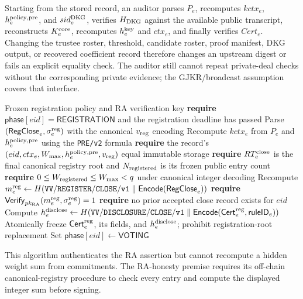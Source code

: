 \documentclass[pdflatex,sn-mathphys-num]{sn-jnl}%
\theoremstyle{thmstyleone}%
\theoremstyle{thmstyletwo}%
\theoremstyle{thmstylethree}%
\begin{document}
\begin{appendices}
Starting from the stored record, an auditor parses $P_e$, recomputes $kctx_e$,
$h_e^{\rm policy,pre}$, and $sid_e^{\rm DKG}$, verifies $H_{\rm DKG}$ against the available public
transcript, reconstructs $K_e^{\rm core}$, recomputes $h_e^{\rm key}$ and
$ctx_e$, and finally verifies $Cert_e$.  Changing the trustee roster, threshold,
candidate roster, proof manifest, DKG output, or recovered coefficient record
therefore changes an upstream digest or fails an explicit equality check.
The auditor still cannot repeat private-deal checks without the corresponding
private evidence; the GJKR/broadcast assumption covers that interface.

\begin{algorithm}[H]
\caption{$\mathsf{CloseRegistration}(eid,\mathsf{Cert}_e^{\rm reg})$}
\label{alg:close-registration}
\begin{algorithmic}[1]
\Require Frozen registration policy and RA verification key
\State \textbf{require} $\mathsf{phase}[eid]=\mathsf{REGISTRATION}$ and the registration deadline has passed
\State Parse $(\mathsf{RegClose}_e,\sigma_e^{\rm reg})$ with the canonical $v_{\rm reg}$ encoding
\State Recompute $kctx_e$ from $P_e$ and $h_e^{\rm policy,pre}$ using the \texttt{PRE/v2} formula
\State \textbf{require} the record's $(eid,ctx_e,W_{\max},h_e^{\rm policy,pre},v_{\rm reg})$ equal immutable storage
\State \textbf{require} $RT_e^{\rm close}$ is the final canonical registry root and $N_{\rm registered}$ is its frozen public entry count
\State \textbf{require} $0\leq W_{\rm registered}\leq W_{\max}<q$ under canonical integer decoding
\State Recompute $m_e^{\rm reg}\gets H(\mathtt{VV/REGISTER/CLOSE/v1}\parallel\mathsf{Encode}(\mathsf{RegClose}_e))$
\State \textbf{require} $\mathsf{Verify}_{pk_{\rm RA}}(m_e^{\rm reg},\sigma_e^{\rm reg})=1$
\State \textbf{require} no prior accepted close record exists for $eid$
\State Compute $h_e^{\rm disclose}\gets H(\mathtt{VV/DISCLOSURE/CLOSE/v1}\parallel\mathsf{Encode}(\mathsf{Cert}_e^{\rm reg},\mathsf{ruleID}_e))$
\State Atomically freeze $\mathsf{Cert}_e^{\rm reg}$, its fields, and $h_e^{\rm disclose}$; prohibit registration-root replacement
\State Set $\mathsf{phase}[eid]\gets\mathsf{VOTING}$
\end{algorithmic}
\end{algorithm}

This algorithm authenticates the RA assertion but cannot recompute a hidden
weight sum from commitments.  The RA-honesty premise requires its off-chain
canonical-registry procedure to check every entry and compute the displayed
integer sum before signing.


\end{appendices}
\end{document}
